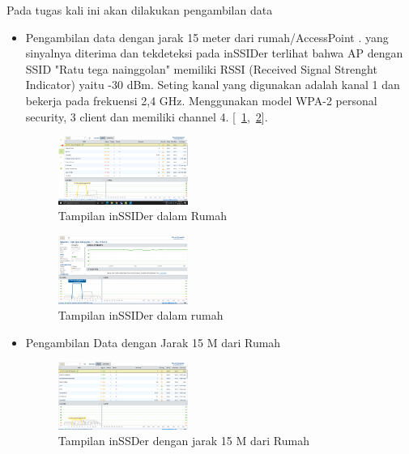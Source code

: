 \documentclass[conference]{IEEEtran}
\begin{document}
Pada tugas kali ini akan dilakukan pengambilan data
\begin{itemize}
\item Pengambilan data dengan jarak 15 meter dari rumah/AccessPoint .
yang sinyalnya diterima dan tekdeteksi pada inSSIDer terlihat bahwa AP dengan SSID 
"Ratu tega nainggolan" memiliki RSSI (Received Signal Strenght Indicator) yaitu -30 dBm. 
Seting kanal yang digunakan adalah kanal 1 dan bekerja pada frekuensi 2,4 GHz. 
Menggunakan model WPA-2 personal security, 3 client dan memiliki channel 4. [~\ref{tampilan dalam rumah_1},~\ref{tampilan dalam rumah_2}].
\vspace{0.2cm}
\begin{figure}[htbp]
    \centering
    \includegraphics[width=0.4\textwidth]{8.png}
    \caption{Tampilan inSSIDer dalam Rumah}
    \label{tampilan dalam rumah_1}
\end{figure}

\begin{figure}[htbp]
    \centering
    \includegraphics[width=0.4\textwidth]{9.png}
    \caption{Tampilan inSSIDer dalam rumah}
    \label{tampilan dalam rumah_2}
\end{figure}



    \item Pengambilan Data dengan Jarak 15 M dari Rumah

    \begin{figure}[htbp]
        \centering
        \includegraphics[width=0.4\textwidth]{10.png}
        \caption{Tampilan inSSDer dengan jarak 15 M dari Rumah}
        \label{Tampilan inSSDer dengan jarak 15 M_1}
    \end{figure}


\end{itemize}
\end{document}
